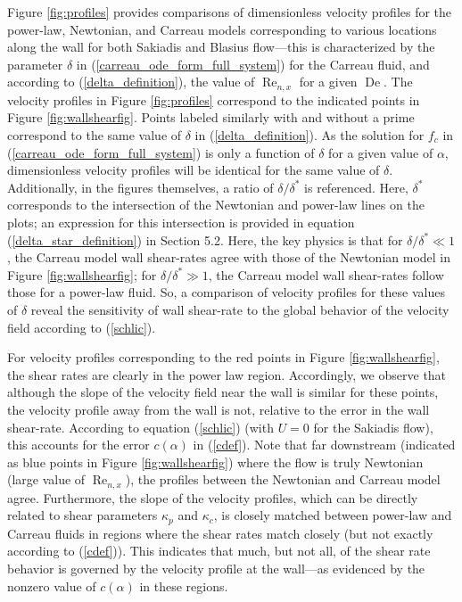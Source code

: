 \documentclass[lineno]{JFM-FLM_Au}
\begin{document}
Figure \ref{fig:profiles} provides comparisons of dimensionless velocity profiles for the power-law, Newtonian, and Carreau models corresponding to various locations along the wall for both Sakiadis and Blasius flow---this is characterized by the parameter $\delta$ in (\ref{carreau_ode_form_full_system}) for the Carreau fluid, and according to (\ref{delta_definition}), the value of $\operatorname{Re}_{n, x}$ for a given $\operatorname{De}$. The velocity profiles in Figure \ref{fig:profiles} correspond to the indicated points in Figure \ref{fig:wallshearfig}.  Points labeled similarly with and without a prime correspond to the same value of $\delta$ in (\ref{delta_definition}).  As the solution for $f_c$ in (\ref{carreau_ode_form_full_system}) is only a function of $\delta$ for a given value of $\alpha$, dimensionless velocity profiles will be identical for the same value of $\delta$.  Additionally, in the figures themselves, a ratio of $\delta/\delta^*$ is referenced.  Here, $\delta^*$ corresponds to the intersection of the Newtonian and power-law lines on the plots; an expression for this intersection is provided in equation (\ref{delta_star_definition}) in Section 5.2.  Here, the key physics is that for $\delta/\delta^* \ll 1$, the Carreau model wall shear-rates agree with those of the Newtonian model in Figure \ref{fig:wallshearfig}; for $\delta/\delta^* \gg 1$, the Carreau model wall shear-rates follow those for a power-law fluid.  So, a comparison of velocity profiles for these values of $\delta$ reveal the sensitivity of wall shear-rate to the global behavior of the velocity field according to (\ref{schlic}).

For velocity profiles corresponding to the red points in Figure \ref{fig:wallshearfig}, the shear rates are clearly in the power law region.  Accordingly, we observe that although the slope of the velocity field near the wall is similar for these points, the velocity profile away from the wall is not, relative to the error in the wall shear-rate.  According to equation (\ref{schlic}) (with $U=0$ for the Sakiadis flow), this accounts for the error $c(\alpha)$ in (\ref{cdef}). Note that far downstream (indicated as blue points in Figure \ref{fig:wallshearfig}) where the flow is truly Newtonian (large value of $\operatorname{Re}_{n, x}$), the profiles between the Newtonian and Carreau model agree. Furthermore, the slope of the velocity profiles, which can be directly related to shear parameters $\kappa_p$ and $\kappa_c$, is closely matched between power-law and Carreau fluids in regions where the shear rates match closely (but not exactly according to (\ref{cdef})).  This indicates that much, but not all, of the shear rate behavior is governed by the velocity profile at the wall---as evidenced by the nonzero value of $c(\alpha)$ in these regions.
\end{document}
